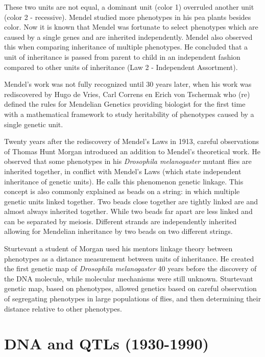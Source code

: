 These two units are not equal, a dominant unit (color 1) overruled another 
unit (color 2 - recessive). Mendel studied more phenotypes in his pea plants 
besides color. Now it is known that Mendel was fortunate to select 
phenotypes which are caused by a single genes and are inherited independently. 
Mendel also observed this when comparing inheritance of multiple phenotypes. 
He concluded that a unit of inheritance is passed from parent to child in an 
independent fashion compared to other units of inheritance 
(Law 2 - Independent Assortment).

Mendel's work was not fully recognized until 30 years later, when his work was 
rediscovered by Hugo de Vries, Carl Correns en Erich von Tschermak who (re) defined the 
rules for Mendelian Genetics \cite{deVries:1889} providing biologist for the first 
time with a mathematical framework to study heritability of phenotypes caused by a 
single genetic unit.

Twenty years after the rediscovery of Mendel's Laws in 1913, careful observations of 
Thomas Hunt Morgan introduced an addition to Mendel's theoretical work. He observed 
that some phenotypes in his \emph{Drosophila melanogaster} mutant flies are inherited 
together, in conflict with Mendel's Laws (which state independent inheritance of 
genetic units). He calls this phenomenon genetic linkage. This concept is also commonly 
explained as beads on a string: in which multiple genetic units linked together. Two beads 
close together are tightly linked are and almost always inherited together. While 
two beads far apart are less linked and can be separated by meiosis. Different 
strands are independently inherited allowing for Mendelian inheritance by two beads 
on two different strings.

Sturtevant a student of Morgan used his mentors linkage theory between phenotypes 
as a distance measurement between units of inheritance. He created the first genetic 
map of \emph{Drosophila melanogaster} 40 years before the discovery of the DNA molecule, 
while molecular mechanisms were still unknown. Sturtevant genetic map, based on 
phenotypes, allowed genetics based on careful observation of segregating phenotypes in 
large populations of flies, and then determining their distance relative to other 
phenotypes.

\section{DNA and QTLs (1930-1990)}


